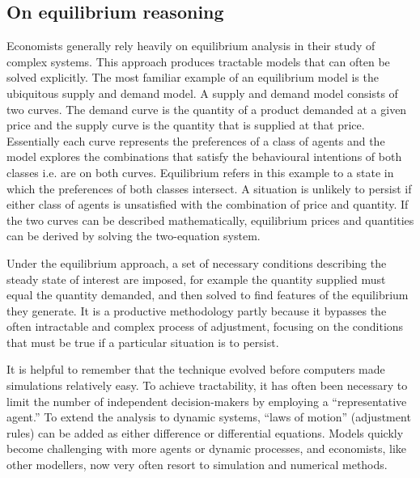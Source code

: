 \subsection{On equilibrium reasoning }
Economists generally rely heavily on equilibrium analysis in their study of complex systems. 
This approach produces tractable models that can often be solved explicitly. The most familiar example of an equilibrium model is the ubiquitous supply and demand model. A supply and demand model consists of two curves. The demand curve is the quantity of a product demanded at a given price and the supply curve is the quantity that is supplied at that price. Essentially each curve represents the preferences of a class of agents and the model explores the combinations that satisfy the behavioural intentions of both classes i.e. are on both curves. Equilibrium refers in this example to a state in which the preferences of both classes intersect. A situation is unlikely to persist if either class of agents is unsatisfied with the combination of price and quantity.  If the two curves can be described mathematically, equilibrium prices and quantities can be derived by solving the two-equation system.

Under the equilibrium approach, a set of necessary conditions describing the steady state of interest are imposed, for example the quantity supplied must equal the quantity demanded, and then solved to find features of the equilibrium they generate. It is a productive methodology partly because it bypasses the often intractable and complex process of adjustment, focusing on the conditions that must be true if a particular situation is to persist. 

It is helpful to remember that the technique evolved before computers made simulations relatively easy. To achieve tractability, it has often been necessary to limit the number of independent decision-makers by employing a ``representative agent.'' To extend the analysis to dynamic systems, ``laws of motion'' (adjustment rules) can be added as either difference or differential equations.  Models quickly become challenging with more agents or dynamic processes, and economists, like other modellers, now very often resort to simulation and numerical methods. 


